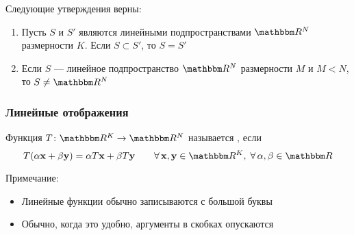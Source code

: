 \begin{frame}

    \vspace{2em}
    \Fact{\eqref{ET-fa:ondsrn}}
        Следующие утверждения верны:
        \begin{enumerate}
            \item Пусть $S$ и $S'$ являются линейными подпространствами $\RR^N$ 
            размерности $K$. Если $S \subset S'$, то $S = S'$
            \item Если $S$ --- линейное подпространство $\RR^N$ размерности $M$ и $M < N$, 
            то $S \not= \RR^N$
        \end{enumerate}
        
\end{frame}



\begin{frame}\frametitle{Линейные отображения}

    \vspace{2em}
    Функция $T \colon \RR^K \to \RR^N$ называется
    , если 
    \begin{equation*}
            T(\alpha \boldx + \beta \boldy) = \alpha T\boldx + \beta T\boldy
            \qquad
            \forall \, 
            \boldx, \boldy \in \RR^K, \;
            \forall \,
            \alpha, \beta \in \RR
    \end{equation*}

    \vspace{.7em}
    
    Примечание: 
    
    \begin{itemize}
        \item Линейные функции обычно записываются с большой буквы
            \vspace{0.5em}
        \item Обычно, когда это удобно, аргументы в скобках опускаются
    \end{itemize}

\end{frame}

